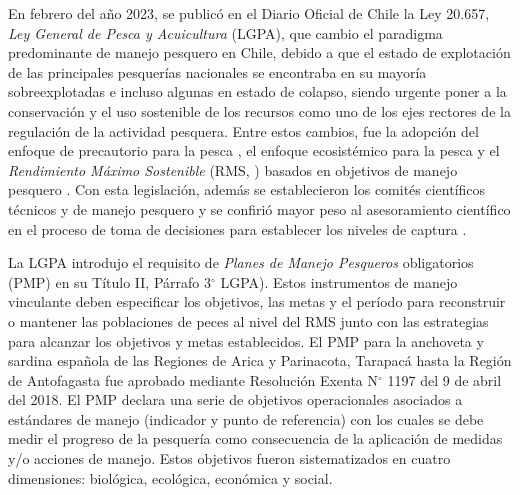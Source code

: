 

En febrero del año 2023, se publicó en el Diario Oficial de Chile la Ley 20.657, \textit{Ley General de Pesca y Acuicultura} (LGPA), que cambio el paradigma predominante de manejo pesquero en Chile, debido a que el estado de explotación de las principales pesquerías nacionales se encontraba en su mayoría sobreexplotadas e incluso algunas en estado de colapso, siendo urgente poner a la conservación y el uso sostenible de los recursos como uno de los ejes rectores de la regulación de la actividad pesquera. Entre estos cambios, fue la adopción del enfoque de precautorio para la pesca \citep{FAO1997}, el enfoque ecosistémico para la pesca \citep{FAO2003} y el \textit{Rendimiento Máximo Sostenible} (RMS, \cite{maunder20089th}) basados en objetivos de manejo pesquero \citep{reyes2017problemas}. Con esta legislación, además se establecieron los comités científicos técnicos y de manejo pesquero y se confirió mayor peso al asesoramiento científico en el proceso de toma de decisiones para establecer los niveles de captura \citep{leal2011informe}.
\newline

La LGPA introdujo el requisito de \textit{Planes de Manejo Pesqueros} obligatorios (PMP) en su Título II, Párrafo 3$^\circ$ LGPA). Estos instrumentos de manejo vinculante deben especificar los objetivos, las metas y el período para reconstruir o mantener las poblaciones de peces al nivel del RMS junto con las estrategias para alcanzar los objetivos y metas establecidos. El PMP para la anchoveta y sardina española de las Regiones de Arica y Parinacota, Tarapacá hasta la Región de Antofagasta fue aprobado mediante Resolución Exenta N$^\circ$ 1197 del 9 de abril del 2018. El PMP declara una serie de objetivos operacionales asociados a estándares de manejo (indicador y punto de referencia) con los cuales se debe medir el progreso de la pesquería como consecuencia de la aplicación de medidas y/o acciones de manejo. Estos objetivos fueron sistematizados en cuatro dimensiones: biológica, ecológica, económica y social.
\newline

